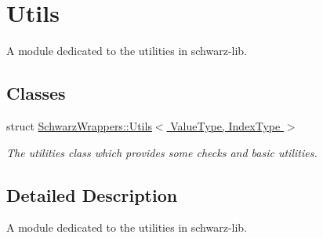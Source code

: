 \hypertarget{group__utils}{}\section{Utils}
\label{group__utils}


A module dedicated to the utilities in schwarz-\/lib.  


\subsection*{Classes}
\begin{DoxyCompactItemize}
\item 
struct \hyperlink{structSchwarzWrappers_1_1Utils}{Schwarz\+Wrappers\+::\+Utils$<$ Value\+Type, Index\+Type $>$}
\begin{DoxyCompactList}\small\item\em The utilities class which provides some checks and basic utilities. \end{DoxyCompactList}\end{DoxyCompactItemize}


\subsection{Detailed Description}
A module dedicated to the utilities in schwarz-\/lib. 

